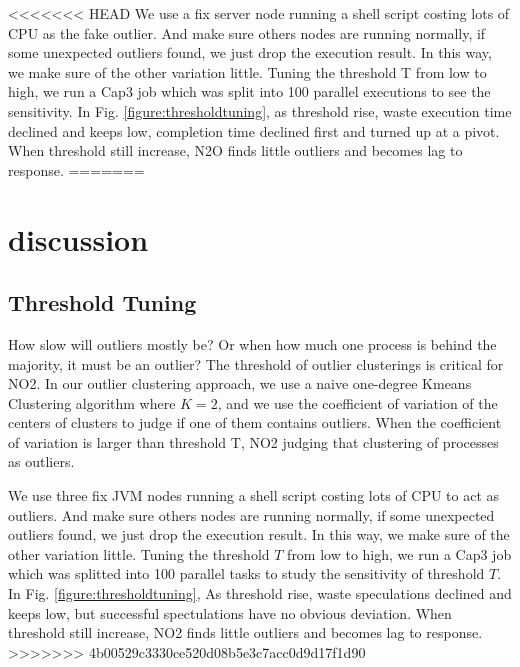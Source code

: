 <<<<<<< HEAD
We use a fix server node running a shell script costing lots of CPU as the fake outlier. And make sure others nodes are running normally, if some unexpected outliers found, we just drop the execution result. In this way, we make sure of the other variation little. Tuning the threshold T from low to high, we run a Cap3 job which was split into 100 parallel executions to see the sensitivity. In Fig. \ref{figure:thresholdtuning}, as threshold rise, waste execution time declined and keeps low, completion time declined first and  turned up at a pivot. When threshold still increase, N2O finds little outliers and becomes lag to response.
=======
\section{discussion}

\subsection{Threshold Tuning}

How slow will outliers mostly be? Or when how much one process is behind the majority, it must be an outlier? The threshold of outlier clusterings is critical for NO2. In our outlier clustering approach, we use a naive one-degree Kmeans Clustering algorithm where $K = 2$, and we use the coefficient of variation of the centers of clusters to judge if one of them contains outliers. When the coefficient of variation is larger than threshold T, NO2 judging that clustering of processes as outliers.

We use three fix JVM nodes running a shell script costing lots of CPU to act as outliers. And make sure others nodes are running normally, if some unexpected outliers found, we just drop the execution result. In this way, we make sure of the other variation little. Tuning the threshold $T$ from low to high, we run a Cap3 job which was splitted into 100 parallel tasks to study the sensitivity of threshold $T$. In Fig. \ref{figure:thresholdtuning}, As threshold rise, waste speculations declined and keeps low, but successful spectulations have no obvious deviation. When threshold still increase, NO2 finds little outliers and becomes lag to response. 
>>>>>>> 4b00529c3330ce520d08b5e3c7acc0d9d17f1d90

